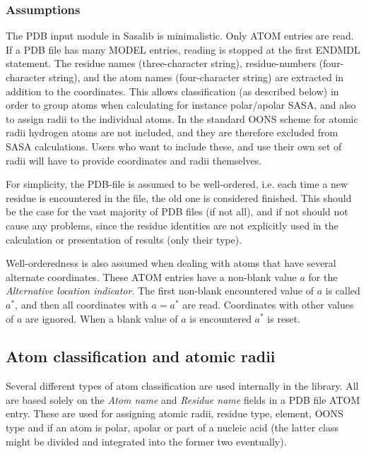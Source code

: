 \documentclass[a4paper,11pt]{article}
\begin{document}
\subsubsection{Assumptions}

The PDB input module in Sasalib is minimalistic. Only ATOM entries are
read. If a PDB file has many MODEL entries, reading is stopped at the
first ENDMDL statement. The residue names (three-character string),
residue-numbers (four-character string), and the atom names
(four-character string) are extracted in addition to the
coordinates. This allows classification (as described below) in order
to group atoms when calculating for instance polar/apolar SASA, and
also to assign radii to the individual atoms. In the standard OONS
scheme for atomic radii hydrogen atoms are not included, and they are
therefore excluded from SASA calculations. Users who want to include
these, and use their own set of radii will have to provide coordinates
 and radii themselves.

For simplicity, the PDB-file is assumed to be well-ordered, i.e. each
time a new residue is encountered in the file, the old one is
considered finished. This should be the case for the vast majority of
PDB files (if not all), and if not should not cause any problems,
since the residue identities are not explicitly used in the
calculation or presentation of results (only their type). 

Well-orderedness is also assumed when dealing with atoms that have
several alternate coordinates. These ATOM entries have a non-blank
value $a$ for the \emph{Alternative location indicator}. The first
non-blank encountered value of $a$ is called $a^*$, and then all
coordinates with $a = a^*$ are read. Coordinates with other values of
$a$ are ignored. When a blank value of $a$ is encountered $a^*$ is
reset.

\subsection{Atom classification and atomic radii}

Several different types of atom classification are used internally in
the library. All are based solely on the \emph{Atom name} and
\emph{Residue name} fields in a PDB file ATOM entry. These are used
for assigning atomic radii, residue type, element, OONS type and if an
atom is polar, apolar or part of a nucleic acid (the latter class
might be divided and integrated into the former two eventually).
\end{document}
